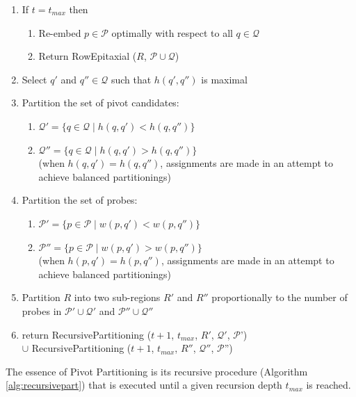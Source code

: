 \documentclass{llncs}
\begin{document}
\begin{algorithm}
\begin{minipage}{4.8in}
\begin{enumerate}
\item If $t = t_{max}$ then
  \begin{enumerate}
    \item Re-embed $p \in \mathcal{P}$ optimally with respect to all $q \in \mathcal{Q}$
    \item Return RowEpitaxial ($R$, $\mathcal{P} \cup \mathcal{Q}$)
  \end{enumerate}
\item Select $q'$ and $q'' \in \mathcal{Q}$ such that $h(q',q'')$ is maximal
\item \label{step:part_pivots} Partition the set of pivot candidates:
  \begin{enumerate}
    \item $\mathcal{Q}' = \{q \in \mathcal{Q} \;|\; h(q,q') < h(q,q'')\}$
    \item $\mathcal{Q}'' = \{q \in \mathcal{Q} \;|\; h(q,q') > h(q,q'')\}$ \\
    (when $h(q,q') = h(q,q'')$, assignments are made in an attempt to
    achieve balanced partitionings)
  \end{enumerate}
\item Partition the set of probes:
  \begin{enumerate}
    \item $\mathcal{P}' = \{p \in \mathcal{P} \;|\; w(p,q') < w(p,q'')\}$
    \item $\mathcal{P}'' = \{p \in \mathcal{P} \;|\; w(p,q') > w(p,q'')\}$ \\
    (when $h(p,q') = h(p,q'')$, assignments are made in an attempt to
    achieve balanced partitionings)
  \end{enumerate}
\item \label{step:part_r} Partition $R$ into two sub-regions $R'$ and $R''$ proportionally to the number of probes
      in $\mathcal{P}' \cup \mathcal{Q}'$ and $\mathcal{P}'' \cup \mathcal{Q}''$
\item return RecursivePartitioning ($t + 1$, $t_{max}$, $R'$, $\mathcal{Q}'$, $\mathcal{P}$') \\
      $\cup$ RecursivePartitioning ($t + 1$, $t_{max}$, $R''$, $\mathcal{Q}''$, $\mathcal{P}$'')
\end{enumerate}

\end{minipage}
\end{algorithm}

The essence of Pivot Partitioning is its recursive procedure
(Algorithm\,\ref{alg:recursivepart}) that is executed until a given recursion
depth $t_{max}$ is reached.
\end{document}
